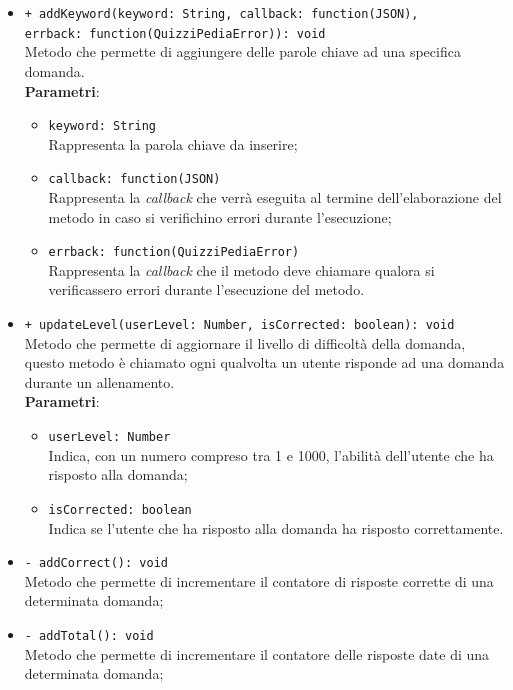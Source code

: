 \begin{itemize}
\begin{itemize}
\begin{itemize}
		\end{itemize}
	\item \texttt{+ addKeyword(keyword: String, callback: function(JSON),\\ errback: function(QuizziPediaError)): void} \\
	Metodo che permette di aggiungere delle parole chiave ad una specifica domanda. \\
		\textbf{Parametri}:
			 \begin{itemize}
			 	\item \texttt{keyword: String} \\
			 	Rappresenta la parola chiave da inserire;
			 	\item \texttt{callback: function(JSON)} \\
			 	Rappresenta la \textit{callback} che verrà eseguita al termine dell'elaborazione del metodo in caso si verifichino errori durante l'esecuzione;
			 	\item \texttt{errback: function(QuizziPediaError)} \\
			 	Rappresenta la \textit{callback} che il metodo deve chiamare qualora si verificassero errori durante l'esecuzione del metodo.
			 \end{itemize}
	\item \texttt{+ updateLevel(userLevel: Number, isCorrected: boolean): void} \\
	Metodo che permette di aggiornare il livello di difficoltà della domanda, questo metodo è chiamato ogni qualvolta un utente risponde ad una domanda durante un allenamento.\\
		\textbf{Parametri}:
			\begin{itemize}
				\item \texttt{userLevel: Number} \\
				Indica, con un numero compreso tra 1 e 1000, l'abilità dell'utente che ha risposto alla domanda;
				\item \texttt{isCorrected: boolean} \\
				Indica se l'utente che ha risposto alla domanda ha risposto correttamente.
			\end{itemize}  
	\item \texttt{- addCorrect(): void} \\
	Metodo che permette di incrementare il contatore di risposte corrette di una determinata domanda;
	\item \texttt{- addTotal(): void} \\
	Metodo che permette di incrementare il contatore delle risposte date di una determinata domanda;

\end{itemize}
\end{itemize}
